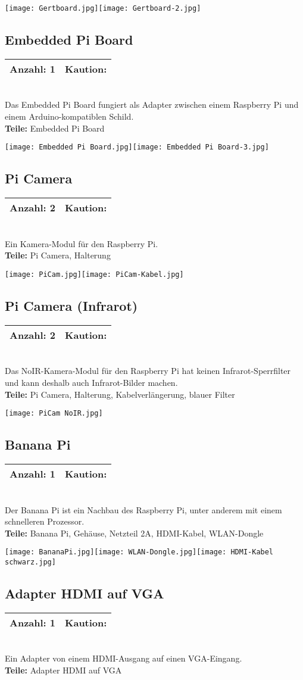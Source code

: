 \documentclass[a4paper]{article}
\newcommand{\infobox}[3] %
        {\par
                \begin{tabular}{| c | c | }
                \hline
                Anzahl: #1 & Kaution: \EUR{#3}   \\
                \hline
                \end{tabular} \\
        }
\begin{document}
\texttt{[image: Gertboard.jpg]}\texttt{[image: Gertboard-2.jpg]}
\newpage
\subsection{Embedded Pi Board}
\infobox{1}{0}{0}
Das Embedded Pi Board fungiert als Adapter zwischen einem Raspberry Pi und einem Arduino-kompatiblen Schild. \\
\textbf{Teile:} Embedded Pi Board

\texttt{[image: Embedded Pi Board.jpg]}\texttt{[image: Embedded Pi Board-3.jpg]}

\subsection{Pi Camera}
\infobox{2}{0}{0}
Ein Kamera-Modul für den Raspberry Pi.\\
\textbf{Teile:} Pi Camera, Halterung

\texttt{[image: PiCam.jpg]}\texttt{[image: PiCam-Kabel.jpg]}

\subsection{Pi Camera (Infrarot)}
\infobox{2}{0}{0}
Das NoIR-Kamera-Modul für den Raspberry Pi hat keinen Infrarot-Sperrfilter und kann deshalb auch Infrarot-Bilder machen. \\
\textbf{Teile:} Pi Camera, Halterung, Kabelverlängerung, blauer Filter

\texttt{[image: PiCam NoIR.jpg]}
\newpage
\subsection{Banana Pi}
\infobox{1}{1}{0}
Der Banana Pi ist ein Nachbau des Raspberry Pi, unter anderem mit einem schnelleren Prozessor. \\
\textbf{Teile:} Banana Pi, Gehäuse, Netzteil 2A, HDMI-Kabel, WLAN-Dongle

\texttt{[image: BananaPi.jpg]}\texttt{[image: WLAN-Dongle.jpg]}\texttt{[image: HDMI-Kabel schwarz.jpg]}

\subsection{Adapter HDMI auf VGA}
\infobox{1}{0}{0}
Ein Adapter von einem HDMI-Ausgang  auf einen VGA-Eingang. \\
\textbf{Teile:} Adapter HDMI auf VGA
\end{document}
